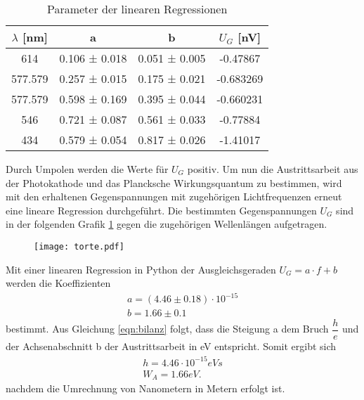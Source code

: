   \begin{table}[H]
    \centering
    \caption{Parameter der linearen Regressionen}
    \label{tab:affenarsch}
    \begin{tabular}{c c c c}
     \toprule
      $\lambda$ [nm] & a & b & $U_G$ [nV]\\
      \midrule
      614     & 0.106 ± 0.018&0.051 ± 0.005&-0.47867  \\
      577.579 & 0.257 ± 0.015&0.175 ± 0.021&-0.683269 \\
      577.579 & 0.598 ± 0.169&0.395 ± 0.044&-0.660231 \\
      546     & 0.721 ± 0.087&0.561 ± 0.033&-0.77884  \\
      434     & 0.579 ± 0.054&0.817 ± 0.026&-1.41017  \\
     \bottomrule
    \end{tabular}
  \end{table} 
  \noindent Durch Umpolen werden die Werte für $U_G$ positiv. Um nun die Austrittsarbeit aus der Photokathode
  und das Plancksche Wirkungsquantum zu bestimmen, wird mit den erhaltenen Gegenspannungen 
  mit zugehörigen Lichtfrequenzen erneut eine lineare Regression durchgeführt. Die bestimmten
  Gegenspannungen $U_G$ sind in der folgenden Grafik \ref{fig:torte} gegen die zugehörigen 
  Wellenlängen aufgetragen.
  \begin{figure}
    \centering
    \texttt{[image: torte.pdf]}
    \caption{}
    \label{fig:torte}
  \end{figure}
  Mit einer linearen Regression in Python der Ausgleichsgeraden $U_G=a\cdot f +b$ 
  werden die Koeffizienten
  \begin{align*}
    a = (4.46 ± 0.18) \cdot 10^{-15}\\
    b = 1.66 ± 0.1
  \end{align*}
  bestimmt. Aus Gleichung \ref{eqn:bilanz} folgt, dass die Steigung a dem Bruch $\dfrac{h}{e}$ und 
  der Achsenabschnitt b der Austrittsarbeit in eV entspricht. Somit ergibt sich
  \begin{align*}
    h = 4.46 \cdot 10^{-15} eVs\\
    W_A = 1.66 eV.
  \end{align*}
  nachdem die Umrechnung von Nanometern in Metern erfolgt ist.

